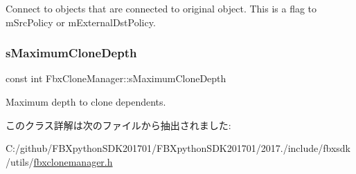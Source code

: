 Connect to objects that are connected to original object. This is a flag to m\+Src\+Policy or m\+External\+Dst\+Policy. \mbox{\label{class_fbx_clone_manager_a1844e81f1b96760b4223024b4c133da7}} 
\subsubsection{\texorpdfstring{s\+Maximum\+Clone\+Depth}{sMaximumCloneDepth}}
{\footnotesize\ttfamily const int Fbx\+Clone\+Manager\+::s\+Maximum\+Clone\+Depth\hspace{0.3cm}{\ttfamily [static]}}



Maximum depth to clone dependents. 



このクラス詳解は次のファイルから抽出されました\+:\begin{DoxyCompactItemize}
\item 
C\+:/github/\+F\+B\+Xpython\+S\+D\+K201701/\+F\+B\+Xpython\+S\+D\+K201701/2017./include/fbxsdk/utils/\hyperlink{fbxclonemanager_8h}{fbxclonemanager.\+h}\end{DoxyCompactItemize}
